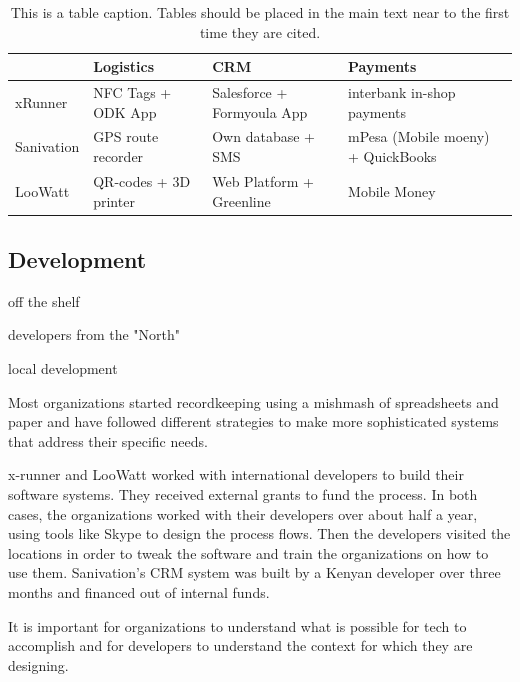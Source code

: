 \documentclass[sustainability,article,submit,moreauthors,pdftex,10pt,a4paper]{mdpi}
\theoremstyle{mdpi}
\newcounter{ex}
\newcounter{re}
\theoremstyle{mdpidefinition}
\begin{document}
\begin{table}[H]
\caption{This is a table caption. Tables should be placed in the main text near to the first time they are cited.}
\label{tbl:BMfx}
\small %
\centering
\begin{tabular}{ p{} |p{} p{} p{} }
\toprule
& \textbf{Logistics} & \textbf{CRM}	 & \textbf{Payments}\\
\midrule
xRunner		& NFC Tags + ODK App	& Salesforce + Formyoula App  & interbank in-shop payments\\
Sanivation & GPS route recorder & Own database + SMS & mPesa (Mobile moeny) + QuickBooks \\
LooWatt		& QR-codes + 3D printer & Web Platform + Greenline	 &  Mobile Money \\
\bottomrule
\end{tabular}
\end{table}

\subsection{Development}
off the shelf

developers from the "North"

local development

Most organizations started recordkeeping using a mishmash of spreadsheets and paper and have followed different strategies to make more sophisticated systems that address their specific needs. %

x-runner and LooWatt worked with international developers to build their software systems. They received external grants to fund the process. In both cases, the organizations worked with their developers over about half a year, using tools like Skype to design the process flows. Then the developers visited the locations in order to tweak the software and train the organizations on how to use them. Sanivation’s CRM system was built by a Kenyan developer over three months and financed out of internal funds. %

It is important for organizations to understand what is possible for tech to accomplish and for developers to understand the context for which they are designing. %
\end{document}
